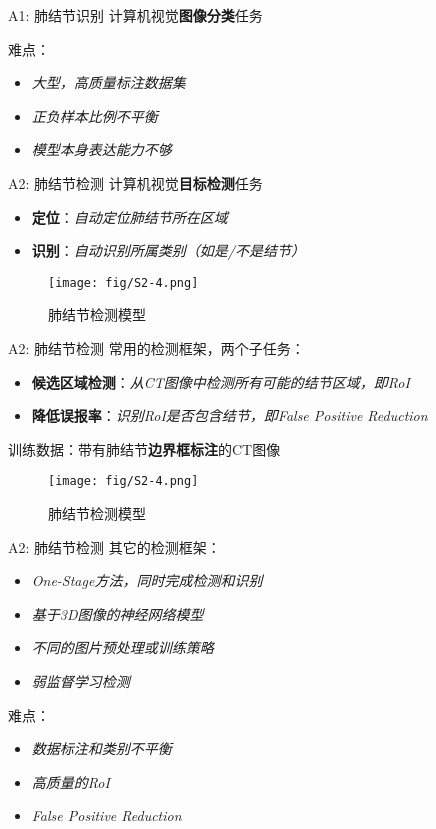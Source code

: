 \documentclass[10pt]{beamer}
\begin{document}
\begin{frame}{A1: 肺结节识别}
  计算机视觉\textbf{图像分类}任务
  \vspace{5 mm}

  难点：
  \begin{itemize}
    \item \textit{大型，高质量标注数据集}
    \item \textit{正负样本比例不平衡}
    \item \textit{模型本身表达能力不够}
  \end{itemize}
\end{frame}

\begin{frame}{A2: 肺结节检测}
  计算机视觉\textbf{目标检测}任务
  \begin{itemize}
    \item \textbf{定位}：\textit{自动定位肺结节所在区域}
    \item \textbf{识别}：\textit{自动识别所属类别（如是/不是结节）}
  \end{itemize}

  \begin{figure}[htbp]
      \centering
      \texttt{[image: fig/S2-4.png]}
      \caption{肺结节检测模型}
  \end{figure}
\end{frame}

\begin{frame}{A2: 肺结节检测}
  常用的检测框架，两个子任务：
  \begin{itemize}
    \item \textbf{候选区域检测}：\textit{从CT图像中检测所有可能的结节区域，即RoI}
    \item \textbf{降低误报率}：\textit{识别RoI是否包含结节，即False Positive Reduction}
  \end{itemize}

  训练数据：带有肺结节\textbf{边界框标注}的CT图像

  \begin{figure}[htbp]
      \centering
      \texttt{[image: fig/S2-4.png]}
      \caption{肺结节检测模型}
  \end{figure}
\end{frame}

\begin{frame}{A2: 肺结节检测}
  其它的检测框架：
  \begin{itemize}
    \item \textit{One-Stage方法，同时完成检测和识别}
    \item \textit{基于3D图像的神经网络模型}
    \item \textit{不同的图片预处理或训练策略}
    \item \textit{弱监督学习检测}
  \end{itemize}

  难点：
  \begin{itemize}
    \item \textit{数据标注和类别不平衡}
    \item \textit{高质量的RoI}
    \item \textit{False Positive Reduction}
  \end{itemize}
\end{frame}
\end{document}
